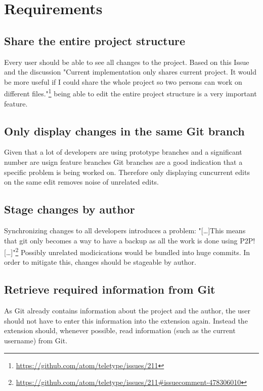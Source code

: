\chapter{Requirements}

\section{Share the entire project structure}

Every user should be able to see all changes to the project.
Based on this Issue and the discussion "Current implementation only shares current project. It would be more useful if I could share the whole project so two persons can work on different files."\footnote{\href{https://github.com/atom/teletype/issues/211}{https://github.com/atom/teletype/issues/211}} being able to edit the entire project structure is a very important feature.

\section{Only display changes in the same Git branch}

Given that a lot of developers are using prototype branches and a significant number are usign feature branches Git branches are a good indication that a specific problem is being worked on.\cite{PhillipsSillitoWalker:2011:Branching_and_merging} Therefore only displaying cuncurrent edits on the same edit removes noise of unrelated edits.

\section{Stage changes by author}

Synchronizing changes to all developers introduces a problem:
"[\dots]This means that git only becomes a way to have a backup as all the work is done using P2P! [\dots]"\footnote{\href{https://github.com/atom/teletype/issues/211\#issuecomment-478306010}{https://github.com/atom/teletype/issues/211\#issuecomment-478306010}}
Possibly unrelated modicications would be bundled into huge commits. In order to mitigate this, changes should be stageable by author.

\section{Retrieve required information from Git}

As Git already contains information about the project and the author, the user should not have to enter this information into the extension again. Instead the extension should, whenever possible, read information (such as the current username) from Git.

